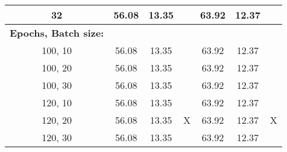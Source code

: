 \begin{table}[H]
\begin{tabular}{ccccccc}
32                                                & 56.08                                                    & 13.35    &                                                             & 63.92                                                   & 12.37    &                                                             \\ \hline
\multicolumn{1}{l}{\textbf{Epochs, Batch size:}}  &                                                          &          &                                                             &                                                         &          &                                                             \\
100, 10                                           & 56.08                                                    & 13.35    &                                                             & 63.92                                                   & 12.37    &                                                             \\
100, 20                                           & 56.08                                                    & 13.35    &                                                             & 63.92                                                   & 12.37    &                                                             \\
100, 30                                           & 56.08                                                    & 13.35    &                                                             & 63.92                                                   & 12.37    &                                                             \\
120, 10                                           & 56.08                                                    & 13.35    &                                                             & 63.92                                                   & 12.37    &                                                             \\
120, 20                                           & 56.08                                                    & 13.35    & X                                                           & 63.92                                                   & 12.37    & X                                                           \\
120, 30                                           & 56.08                                                    & 13.35    &                                                             & 63.92                                                   & 12.37    &                                                             \\

\end{tabular}
\end{table}
